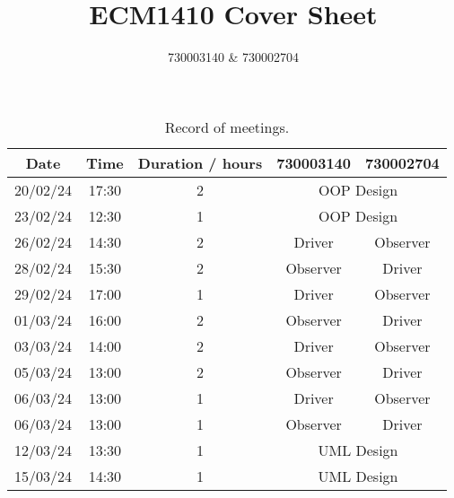 \documentclass{article}
\title{ECM1410 Cover Sheet}
\author{730003140 \& 730002704}
\begin{document}
\maketitle

\begin{table}
    \centering
    \begin{tabular}{ccccc}
        \toprule
        \textbf{Date} & \textbf{Time} & \textbf{Duration / hours} & \textbf{730003140}             & \textbf{730002704} \\
        \midrule
        20/02/24      & 17:30         & 2                         & \multicolumn{2}{c}{OOP Design}                      \\
        23/02/24      & 12:30         & 1                         & \multicolumn{2}{c}{OOP Design}                      \\
        26/02/24      & 14:30         & 2                         & Driver                         & Observer           \\
        28/02/24      & 15:30         & 2                         & Observer                       & Driver             \\
        29/02/24      & 17:00         & 1                         & Driver                         & Observer           \\
        01/03/24      & 16:00         & 2                         & Observer                       & Driver             \\
        03/03/24      & 14:00         & 2                         & Driver                         & Observer           \\
        05/03/24      & 13:00         & 2                         & Observer                       & Driver             \\
        06/03/24      & 13:00         & 1                         & Driver                         & Observer           \\
        06/03/24      & 13:00         & 1                         & Observer                       & Driver             \\
        12/03/24      & 13:30         & 1                         & \multicolumn{2}{c}{UML Design}                      \\
        15/03/24      & 14:30         & 1                         & \multicolumn{2}{c}{UML Design}                      \\

        \bottomrule
    \end{tabular}
    \caption{Record of meetings.}
\end{table}
\end{document}
